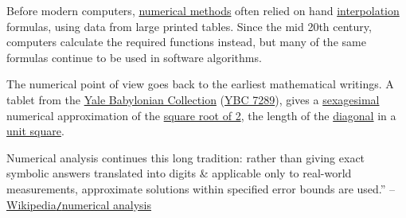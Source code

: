 \documentclass[oneside]{book}
\numberwithin{equation}{section}
\begin{document}
Before modern computers, \href{https://en.wikipedia.org/wiki/Numerical_method}{numerical methods} often relied on hand \href{https://en.wikipedia.org/wiki/Interpolation}{interpolation} formulas, using data from large printed tables. Since the mid 20th century, computers calculate the required functions instead, but many of the same formulas continue to be used in software algorithms.

The numerical point of view goes back to the earliest mathematical writings. A tablet from the \href{https://en.wikipedia.org/wiki/Yale_Babylonian_Collection}{Yale Babylonian Collection} (\href{https://en.wikipedia.org/wiki/YBC_7289}{YBC 7289}), gives a \href{https://en.wikipedia.org/wiki/Sexagesimal}{sexagesimal} numerical approximation of the \href{https://en.wikipedia.org/wiki/Square_root_of_2}{square root of 2}, the length of the \href{https://en.wikipedia.org/wiki/Diagonal}{diagonal} in a \href{https://en.wikipedia.org/wiki/Unit_square}{unit square}.

Numerical analysis continues this long tradition: rather than giving exact symbolic answers translated into digits \& applicable only to real-world measurements, approximate solutions within specified error bounds are used.'' -- \href{https://en.wikipedia.org/wiki/Numerical_analysis}{Wikipedia\texttt{/}numerical analysis}
\end{document}
